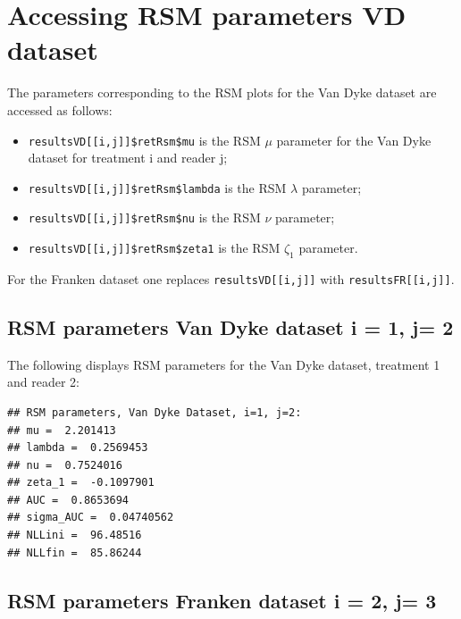 \documentclass[
]{book}
\providecommand{\tightlist}{%
  \setlength{\itemsep}{0pt}\setlength{\parskip}{0pt}}
\begin{document}
\hypertarget{rsm-3-fits-rsm-parameters}{%
\section{Accessing RSM parameters VD dataset}\label{rsm-3-fits-rsm-parameters}}

The parameters corresponding to the RSM plots for the Van Dyke dataset are accessed as follows:

\begin{itemize}
\tightlist
\item
  \texttt{resultsVD{[}{[}i,j{]}{]}\$retRsm\$mu} is the RSM \(\mu\) parameter for the Van Dyke dataset for treatment i and reader j;
\item
  \texttt{resultsVD{[}{[}i,j{]}{]}\$retRsm\$lambda} is the RSM \(\lambda\) parameter;\\
\item
  \texttt{resultsVD{[}{[}i,j{]}{]}\$retRsm\$nu} is the RSM \(\nu\) parameter;
\item
  \texttt{resultsVD{[}{[}i,j{]}{]}\$retRsm\$zeta1} is the RSM \(\zeta_1\) parameter.
\end{itemize}

For the Franken dataset one replaces \texttt{resultsVD{[}{[}i,j{]}{]}} with \texttt{resultsFR{[}{[}i,j{]}{]}}.

\hypertarget{rsm-parameters-van-dyke-dataset-i-1-j-2}{%
\subsection{RSM parameters Van Dyke dataset i = 1, j= 2}\label{rsm-parameters-van-dyke-dataset-i-1-j-2}}

The following displays RSM parameters for the Van Dyke dataset, treatment 1 and reader 2:

\begin{verbatim}
## RSM parameters, Van Dyke Dataset, i=1, j=2: 
## mu =  2.201413 
## lambda =  0.2569453 
## nu =  0.7524016 
## zeta_1 =  -0.1097901 
## AUC =  0.8653694 
## sigma_AUC =  0.04740562 
## NLLini =  96.48516 
## NLLfin =  85.86244
\end{verbatim}

\hypertarget{rsm-parameters-franken-dataset-i-2-j-3}{%
\subsection{RSM parameters Franken dataset i = 2, j= 3}\label{rsm-parameters-franken-dataset-i-2-j-3}}
\end{document}
